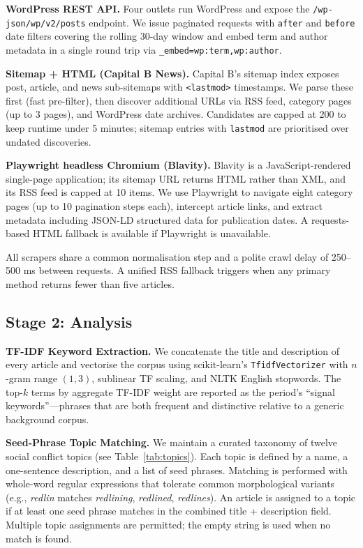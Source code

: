 \documentclass[sigconf,anonymous,review]{acmart}
\begin{document}
\noindent\textbf{WordPress REST API.}
Four outlets run WordPress and expose the \texttt{/wp-json/wp/v2/posts}
endpoint.
We issue paginated requests with \texttt{after} and \texttt{before} date
filters covering the rolling 30-day window and embed term and author metadata
in a single round trip via \texttt{\_embed=wp:term,wp:author}.

\noindent\textbf{Sitemap + HTML (Capital B News).}
Capital B's sitemap index exposes post, article, and news sub-sitemaps with
\texttt{<lastmod>} timestamps.
We parse these first (fast pre-filter), then discover additional URLs via RSS
feed, category pages (up to 3 pages), and WordPress date archives.
Candidates are capped at 200 to keep runtime under 5 minutes; sitemap entries
with \texttt{lastmod} are prioritised over undated discoveries.

\noindent\textbf{Playwright headless Chromium (Blavity).}
Blavity is a JavaScript-rendered single-page application; its sitemap URL
returns HTML rather than XML, and its RSS feed is capped at 10 items.
We use Playwright to navigate eight category pages (up to 10 pagination steps
each), intercept article links, and extract metadata including JSON-LD
structured data for publication dates.
A requests-based HTML fallback is available if Playwright is unavailable.

All scrapers share a common normalisation step and a polite crawl delay of
250–500 ms between requests.
A unified RSS fallback triggers when any primary method returns fewer than
five articles.

\subsection{Stage 2: Analysis}

\noindent\textbf{TF-IDF Keyword Extraction.}
We concatenate the title and description of every article and vectorise the
corpus using scikit-learn's \texttt{TfidfVectorizer} with
$n$-gram range $(1,3)$, sublinear TF scaling, and NLTK English stopwords.
The top-$k$ terms by aggregate TF-IDF weight are reported as the period's
``signal keywords''—phrases that are both frequent and distinctive relative to
a generic background corpus.

\noindent\textbf{Seed-Phrase Topic Matching.}
We maintain a curated taxonomy of twelve social conflict topics (see
Table~\ref{tab:topics}).
Each topic is defined by a name, a one-sentence description, and a list of seed
phrases.
Matching is performed with whole-word regular expressions that tolerate common
morphological variants (e.g., \emph{redlin} matches \emph{redlining},
\emph{redlined}, \emph{redlines}).
An article is assigned to a topic if at least one seed phrase matches in the
combined title + description field.
Multiple topic assignments are permitted; the empty string is used when no
match is found.
\end{document}
